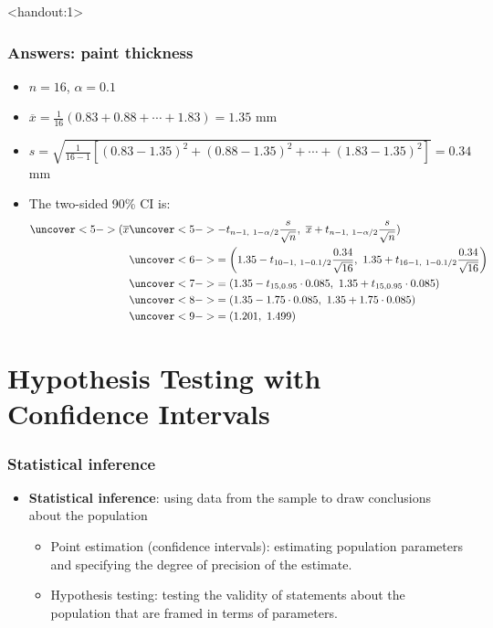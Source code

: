 \documentclass[handout]{beamer}\usepackage{graphicx, color}
\newcommand{\answers}{1}
\providecommand{\ov}[1]{\overline{#1}}
\numberwithin{equation}{section}
\begin{document}
\begin{frame}<handout:\answers>
\frametitle{Answers: paint thickness} \scriptsize
\begin{itemize}
\item $n = 16$, $\alpha = 0.1$
\pause \item $\ov{x} = \frac{1}{16}(0.83 + 0.88 + \cdots + 1.83) = 1.35$ mm
\pause \item $s = \sqrt{\frac{1}{16-1} [(0.83 - 1.35)^2 + (0.88 - 1.35)^2 + \cdots + (1.83-1.35)^2]} = 0.34$ mm
\pause \item The two-sided 90\% CI is:
\begin{align*}
\uncover<5->{(\ov{x}}&\uncover<5->{ - t_{n - 1, \ 1 - \alpha/2} \frac{s}{\sqrt{n}},\ \ov{x} + t_{n - 1, \ 1- \alpha/2 } \frac{s}{\sqrt{n}})} \\
&\uncover<6->{= \left (1.35 - t_{10 - 1, \ 1 - 0.1/2} \frac{0.34}{\sqrt{16}}, \ 1.35 + t_{16 - 1, \ 1 - 0.1/2} \frac{0.34}{\sqrt{16}} \right )} \\
&\uncover<7->{= (1.35 - t_{15, 0.95} \cdot 0.085, \ 1.35 + t_{15, 0.95} \cdot0.085)} \\
&\uncover<8->{= (1.35 - 1.75 \cdot 0.085, \ 1.35 + 1.75 \cdot 0.085)} \\
&\uncover<9->{= (1.201, \ 1.499)}
\end{align*}
\end{itemize}

\end{frame}




\section{Hypothesis Testing with Confidence Intervals}
\begin{frame}
\frametitle{Statistical inference}
\begin{itemize}
\item {\bf Statistical inference}: using data from the sample to draw conclusions about the population 
\begin{itemize}
\pause \item Point estimation (confidence intervals): estimating population parameters and specifying the degree of precision of the estimate.
\pause \item Hypothesis testing: testing the validity of statements about the population that are framed in terms of parameters. 
\end{itemize}
\end{itemize}
\end{frame}
\end{document}

